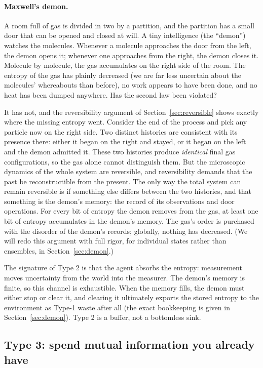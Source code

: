 \documentclass[10pt]{article}
\theoremstyle{definition}
\theoremstyle{remark}
\begin{document}
\paragraph{Maxwell's demon.} A room full of gas is divided in two by a partition, and the partition has a small door that can be opened and closed at will. A tiny intelligence (the ``demon'') watches the molecules. Whenever a molecule approaches the door from the left, the demon opens it; whenever one approaches from the right, the demon closes it. Molecule by molecule, the gas accumulates on the right side of the room. The entropy of the gas has plainly decreased (we are far less uncertain about the molecules' whereabouts than before), no work appears to have been done, and no heat has been dumped anywhere. Has the second law been violated?

It has not, and the reversibility argument of Section~\ref{sec:reversible} shows exactly where the missing entropy went. Consider the end of the process and pick any particle now on the right side. Two distinct histories are consistent with its presence there: either it began on the right and stayed, or it began on the left and the demon admitted it. These two histories produce \emph{identical} final gas configurations, so the gas alone cannot distinguish them. But the microscopic dynamics of the whole system are reversible, and reversibility demands that the past be reconstructible from the present. The only way the total system can remain reversible is if something else differs between the two histories, and that something is the demon's memory: the record of its observations and door operations. For every bit of entropy the demon removes from the gas, at least one bit of entropy accumulates in the demon's memory. The gas's order is purchased with the disorder of the demon's records; globally, nothing has decreased. (We will redo this argument with full rigor, for individual states rather than ensembles, in Section~\ref{sec:demon}.)

The signature of Type 2 is that the agent absorbs the entropy: measurement moves uncertainty from the world into the measurer. The demon's memory is finite, so this channel is exhaustible. When the memory fills, the demon must either stop or clear it, and clearing it ultimately exports the stored entropy to the environment as Type-1 waste after all (the exact bookkeeping is given in Section~\ref{sec:demon}). Type 2 is a buffer, not a bottomless sink.

\subsection{Type 3: spend mutual information you already have}
\label{sec:type3}
\end{document}
